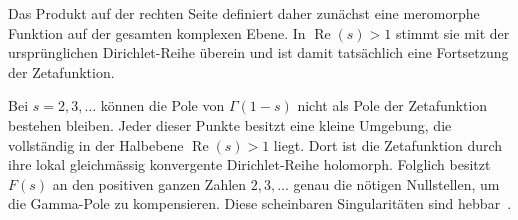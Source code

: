 %			
%			
%			
%			
Das Produkt auf der rechten Seite definiert daher zunächst eine meromorphe Funktion auf der gesamten komplexen Ebene. 
In $\operatorname{Re}(s)>1$ stimmt sie mit der ursprünglichen Dirichlet-Reihe überein und ist damit tatsächlich eine Fortsetzung der Zetafunktion.

Bei $s=2,3,\ldots$ können die Pole von $\Gamma(1-s)$ nicht als Pole der Zetafunktion bestehen bleiben. 
Jeder dieser Punkte besitzt eine kleine Umgebung, die vollständig in der Halbebene $\operatorname{Re}(s)>1$ liegt.
Dort ist die Zetafunktion durch ihre lokal gleichmässig konvergente Dirichlet-Reihe holomorph. 
Folglich besitzt $F(s)$ an den positiven ganzen Zahlen $2,3,\ldots$ genau die nötigen Nullstellen, um die Gamma-Pole zu kompensieren. 
Diese scheinbaren Singularitäten sind hebbar~\cite{hankel:titchmarsh,hankel:dlmf}.

